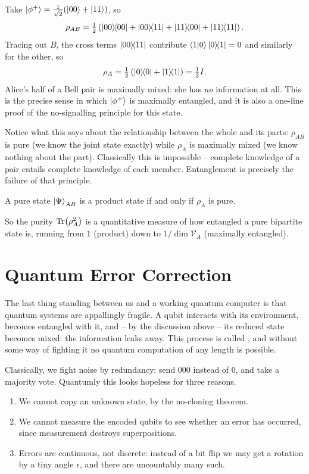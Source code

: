 \documentclass[a4paper]{scrartcl}
\newcommand{\Vs}{\mathcal{V}}
\begin{document}
\begin{example}
	Take $\ket{\phi^+} = \tfrac1{\sqrt2}(\ket{00}+\ket{11})$, so
	$$\rho_{AB} = \tfrac12\left(\op{00}{00}+\op{00}{11}+\op{11}{00}+\op{11}{11}\right).$$
	Tracing out $B$, the cross terms $\op{00}{11}$ contribute $\ip{1}{0}\op{0}{1} = 0$ and similarly for the other, so
	$$\rho_A = \tfrac12\left(\op{0}{0}+\op{1}{1}\right) = \tfrac12I.$$
	Alice's half of a Bell pair is maximally mixed: she has \emph{no} information at all. This is the precise sense in which $\ket{\phi^+}$ is maximally entangled, and it is also a one-line proof of the no-signalling principle for this state.
\end{example}

Notice what this says about the relationship between the whole and its parts: $\rho_{AB}$ is pure (we know the joint state exactly) while $\rho_A$ is maximally mixed (we know nothing about the part). Classically this is impossible -- complete knowledge of a pair entails complete knowledge of each member. Entanglement is precisely the failure of that principle.

\begin{proposition}
	A pure state $\ket{\Psi}_{AB}$ is a product state if and only if $\rho_A$ is pure.
\end{proposition}

So the purity $\Tr(\rho_A^2)$ is a quantitative measure of how entangled a pure bipartite state is, running from $1$ (product) down to $1/\dim\Vs_A$ (maximally entangled).

\section{Quantum Error Correction}

The last thing standing between us and a working quantum computer is that quantum systems are appallingly fragile. A qubit interacts with its environment, becomes entangled with it, and -- by the discussion above -- its reduced state becomes mixed: the information leaks away. This process is called , and without some way of fighting it no quantum computation of any length is possible.

Classically, we fight noise by redundancy: send $000$ instead of $0$, and take a majority vote. Quantumly this looks hopeless for three reasons.

\begin{enumerate}[label=(\roman*)]
	\item We cannot copy an unknown state, by the no-cloning theorem.
	\item We cannot measure the encoded qubits to see whether an error has occurred, since measurement destroys superpositions.
	\item Errors are continuous, not discrete: instead of a bit flip we may get a rotation by a tiny angle $\epsilon$, and there are uncountably many such.
\end{enumerate}
\end{document}
